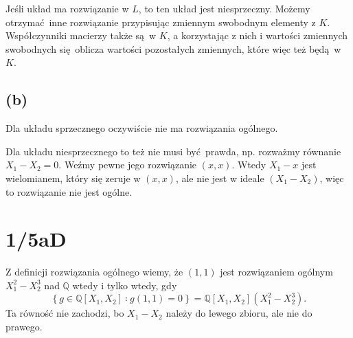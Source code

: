 \documentclass[a4paper, 12pt]{article}
\DeclareMathOperator{\Char}{char}
\newcommand{\+}{\enspace}
\begin{document}
Jeśli układ ma rozwiązanie w $L$, to ten układ jest niesprzeczny.
Możemy otrzymać inne rozwiązanie przypisując zmiennym swobodnym elementy z $K$.
Współczynniki macierzy także są w $K$,
a korzystając z nich i wartości zmiennych swobodnych się oblicza wartości
pozostałych zmiennych,
które więc też będą w $K$.

\subsection*{(b)}
Dla układu sprzecznego oczywiście nie ma rozwiązania ogólnego.

Dla układu niesprzecznego to też nie musi być prawda, np.
rozważmy równanie $X_1 - X_2 = 0$.
Weźmy pewne jego rozwiązanie $(x, x)$.
Wtedy $X_1 - x$ jest wielomianem, który się zeruje w $(x,x)$, ale
nie jest w ideale $(X_1 - X_2)$, więc to rozwiązanie nie jest ogólne.

\iffalse
\section*{1/6D}
Załóżmy, że $f ∈ K[X]$ jest nierozkładalny stopnia $n > 0$,
$\Char K = 0$, $L$ jest ciałem rozkładu wielomianu $f$ nad $K$.

Ciało $L$ możemy utożsamiać z $K[X] / (f)$.
Zatem jego elementy są postaci
$$∑_{k=0}^{n-1} c_k α^k,$$
gdzie $c_k ∈ K$, a $α = X + f$ to pierwiastek $f$.

Ciało $L$ jest nieskończone,
więc zawiera podciało izomorficzne z $ℚ$ zachowywane przez automorfizmy.
\fi

\section*{1/5aD}
Z definicji rozwiązania ogólnego wiemy, że $(1,1)$ jest rozwiązaniem
ogólnym $X_1^2 - X_2^3$ nad $ℚ$ wtedy i tylko wtedy, gdy
$$\left\{ g ∈ ℚ[X_1, X_2] ∶ g(1, 1) = 0 \right\} = ℚ[X_1, X_2](X_1^2 - X_2^3).$$
Ta równość nie zachodzi, bo $X_1 - X_2$ należy do lewego zbioru,
ale nie do prawego.
\end{document}
